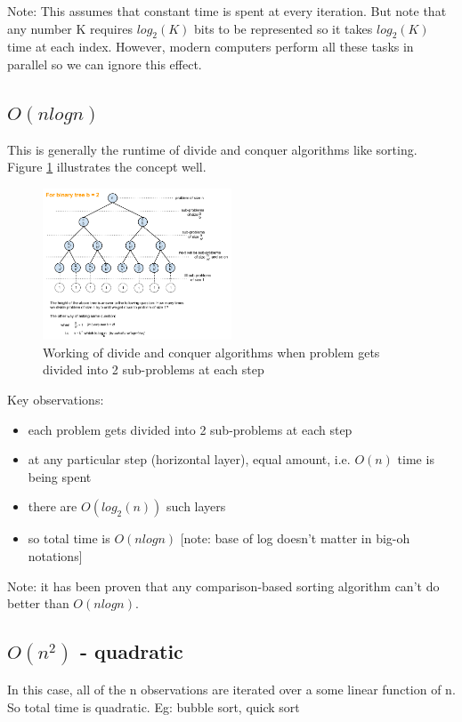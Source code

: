 Note: This assumes that constant time is spent at every iteration. But note that any number K requires $log_2(K)$ bits to be represented so it takes $log_2(K)$ time at each index. However, modern computers perform all these tasks in parallel so we can ignore this effect.

\subsection{$O(nlogn)$}
This is generally the runtime of divide and conquer algorithms like sorting. Figure \ref{fig:divide_n_conquer} illustrates the concept well.

\begin{figure}[ht]
  \begin{center}
    \includegraphics[width=0.5\textwidth]{figures/divide_n_conquer.png}
    \caption{Working of divide and conquer algorithms \protect\footnotemark when problem gets divided into 2 sub-problems at each step}
    \label{fig:divide_n_conquer}
  \end{center}
\end{figure}

Key observations:
\begin{itemize}
    \item each problem gets divided into 2 sub-problems at each step
    \item at any particular step (horizontal layer), equal amount, i.e. $O(n)$ time is being spent
    \item there are $O(log_2(n))$ such layers
    \item so total time is $O(nlogn)$ [note: base of log doesn't matter in big-oh notations]
\end{itemize}

Note: it has been proven that any comparison-based sorting algorithm can't do better than $O(nlogn)$.

\subsection{$O(n^2)$ - quadratic}
In this case, all of the n observations are iterated over a some linear function of n. So total time is quadratic. Eg: bubble sort, quick sort

